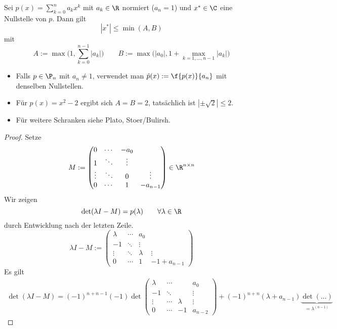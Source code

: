 \documentclass[11pt]{scrartcl}
\begin{document}
\begin{st} \label{3.9}
	Sei $p(x) = \sum_{k=0}^n a_k x^k$ mit $a_k \in \R$ normiert ($a_n = 1$) und $x^* \in \C$ eine Nullstelle von $p$.
	Dann gilt
	\[
		|x^*| \le \min(A,B)
	\]
	mit
	\[
		A := \max\bigg(1, \sum_{k=0}^{n-1} |a_k| \bigg) \qquad
		B := \max\bigg(|a_0|, 1+\max_{k=1,\dotsc,n-1} |a_k|\bigg)
	\]
	\begin{note}
		\begin{itemize}
			\item
				Falls $p\in \P_n$ mit $a_n \neq 1$, verwendet man $\hat p(x) := \f {p(x)}{a_n}$ mit denselben Nullstellen.
			\item
				Für $p(x) = x^2-2$ ergibt sich $A=B=2$, tatsächlich ist $|\pm \sqrt2| \le 2$.
			\item
				Für weitere Schranken siehe Plato, Stoer/Bulirsh.
		\end{itemize}
	\end{note}
	\begin{proof}
		Setze
		\[
			M := \begin{pmatrix}
				0 & \cdots & -a_0 \\
				1 & \ddots & \vdots \\
				\vdots & \ddots & 0 & \vdots \\
				0 & \cdots & 1 & -a_{n-1}
			\end{pmatrix}
			\in \R^{n\times n}
		\]
		Wir zeigen
		\[
			\det(\lambda I - M) = p(\lambda) \qquad \forall \lambda \in \R
		\]
		durch Entwicklung nach der letzten Zeile.
		\[
			\lambda I - M := \begin{pmatrix}
				\lambda & \cdots & a_0 \\
				-1 & \ddots & \vdots \\
				\vdots & \ddots & \lambda & \vdots \\
				0 & \cdots & 1 & -1 + a_{n-1}
			\end{pmatrix}
		\]
		Es gilt
		\begin{align*}
			\det(\lambda I - M) = (-1)^{n+n-1}(-1) \det \begin{pmatrix}
				\lambda & \cdots & & a_0 \\
				-1 & \ddots & & \vdots \\
				\vdots & \cdots & \lambda & \vdots \\
				0 & \cdots & -1 & a_{n-2}
			\end{pmatrix}
			 + (-1)^{n+n} (\lambda + a_{n-1}) \underbrace{\det (\dotsc)}_{=\lambda^{(n-1)}}
		\end{align*}

\end{proof}
\end{st}
\end{document}
